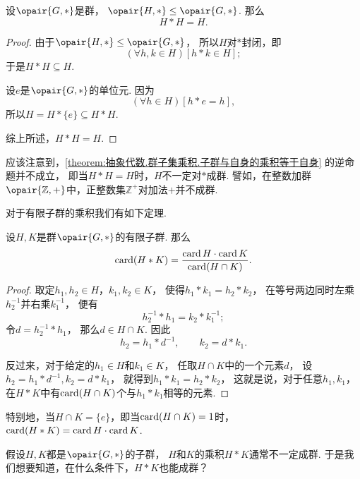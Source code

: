 \begin{proposition}\label{theorem:抽象代数.群子集乘积.子群与自身的乘积等于自身}
设\(\opair{G,*}\)是群，
\(\opair{H,*} \AlgebraSubstructure \opair{G,*}\).
那么\[
	H * H = H.
\]
\begin{proof}
由于\(\opair{H,*}\AlgebraSubstructure\opair{G,*}\)，
所以\(H\)对\(*\)封闭，即\[
	(\forall h,k \in H)
	[h * k \in H];
\]
于是\(H * H \subseteq H\).

设\(e\)是\(\opair{G,*}\)的单位元.
因为\[
	(\forall h \in H)
	[h * e = h],
\]
所以\(H = H * \{e\} \subseteq H * H\).

综上所述，\(H * H = H\).
\end{proof}
\end{proposition}

应该注意到，\cref{theorem:抽象代数.群子集乘积.子群与自身的乘积等于自身} 的逆命题并不成立，
即当\(H * H = H\)时，\(H\)不一定对\(*\)成群.
譬如，在整数加群\(\opair{\mathbb{Z},+}\)中，正整数集\(\mathbb{Z}^+\)对加法\(+\)并不成群.

对于有限子群的乘积我们有如下定理.
\begin{theorem}
设\(H,K\)是群\(\opair{G,*}\)的有限子群.
那么\[
	\operatorname{card}(H * K)
	= \frac{\operatorname{card} H \cdot \operatorname{card} K}{\operatorname{card}(H \cap K)}.
\]
\begin{proof}
取定\(h_1,h_2 \in H\)，\(k_1,k_2 \in K\)，
使得\(h_1 * k_1 = h_2 * k_2\)，
在等号两边同时左乘\(h_2^{-1}\)并右乘\(k_1^{-1}\)，
便有\[
	h_2^{-1} * h_1 = k_2 * k_1^{-1};
\]
令\(d = h_2^{-1} * h_1\)，
那么\(d \in H \cap K\).
因此\[
	h_2 = h_1 * d^{-1}, \qquad
	k_2 = d * k_1.
\]

反过来，对于给定的\(h_1 \in H\)和\(k_1 \in K\)，
任取\(H \cap K\)中的一个元素\(d\)，
设\(h_2 = h_1 * d^{-1},
k_2 = d * k_1\)，
就得到\(h_1 * k_1 = h_2 * k_2\)，
这就是说，对于任意\(h_1,k_1\)，
在\(H * K\)中有\(\operatorname{card}(H \cap K)\)个与\(h_1 * k_1\)相等的元素.
\end{proof}
\end{theorem}

特别地，当\(H \cap K = \{e\}\)，即当\(\operatorname{card}(H \cap K) = 1\)时，
\(\operatorname{card}(H * K) = \operatorname{card} H \cdot \operatorname{card} K\).

假设\(H,K\)都是\(\opair{G,*}\)的子群，
\(H\)和\(K\)的乘积\(H * K\)通常不一定成群.
于是我们想要知道，在什么条件下，\(H * K\)也能成群？

